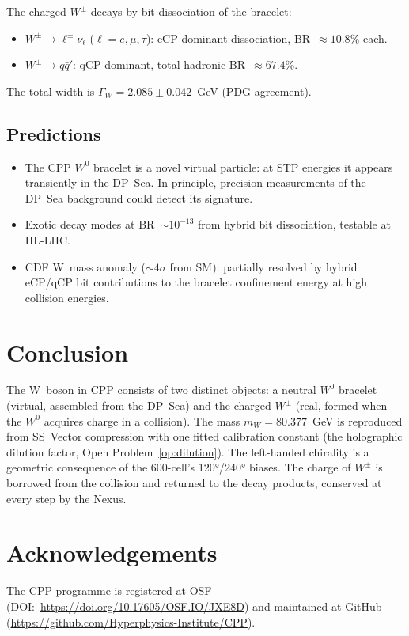 \documentclass[11pt,letterpaper]{article}
\begin{document}
The charged $W^\pm$ decays by bit dissociation of the bracelet:
\begin{itemize}
\item $W^\pm \to \ell^\pm\nu_\ell$ ($\ell = e,\mu,\tau$):
  eCP-dominant dissociation, BR~$\approx 10.8\%$ each.
\item $W^\pm \to q\bar{q}'$: qCP-dominant, total hadronic
  BR~$\approx 67.4\%$.
\end{itemize}
The total width is $\Gamma_W = 2.085\pm0.042$~GeV (PDG agreement).

\subsection{Predictions}

\begin{itemize}
\item The CPP $W^0$ bracelet is a novel virtual particle: at STP
  energies it appears transiently in the DP~Sea.  In principle,
  precision measurements of the DP~Sea background could detect its
  signature.
\item Exotic decay modes at BR~$\sim10^{-13}$ from hybrid bit
  dissociation, testable at HL-LHC.
\item CDF W~mass anomaly ($\sim4\sigma$ from SM): partially resolved
  by hybrid eCP/qCP bit contributions to the bracelet confinement
  energy at high collision energies.
\end{itemize}

\section{Conclusion}

The W~boson in CPP consists of two distinct objects: a neutral
$W^0$ bracelet (virtual, assembled from the DP~Sea) and the charged
$W^\pm$ (real, formed when the $W^0$ acquires charge in a collision).
The mass $m_W = 80.377$~GeV is reproduced from SS~Vector compression
with one fitted calibration constant (the holographic dilution factor,
Open Problem~\ref{op:dilution}).  The left-handed chirality is a
geometric consequence of the 600-cell's 120°/240° biases.  The
charge of $W^\pm$ is borrowed from the collision and returned to the
decay products, conserved at every step by the Nexus.





\section*{Acknowledgements}
The CPP programme is registered at OSF (DOI:~\url{https://doi.org/10.17605/OSF.IO/JXE8D}) and maintained at GitHub (\url{https://github.com/Hyperphysics-Institute/CPP}).
\end{document}
